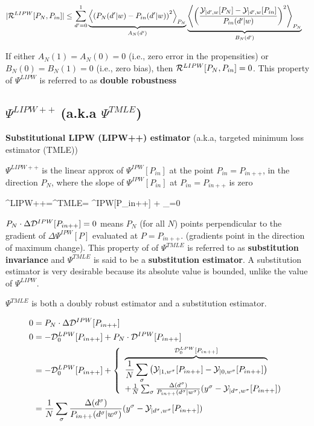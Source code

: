 \begin{align}
|{\cal R}^{LIPW}[P_N,P_{in}]|&\leq
\sum_{d'=0}^1
\underbrace{
\left\langle
\left(
P_N(d'|w)-P_{in}(d'|w)
\right)^2
\right\rangle_{P_N}
}_{A_N(d')}
\underbrace{
\left\langle
\left(
\frac{
{\cal Y}_{|d',w}[P_N]-{\cal Y}_{|d',w}[P_{in}]}
{P_{in}(d'|w)}
\right)^2
\right\rangle_{P_N}
}_{B_N(d')}
\end{align}

If either $A_N(1)=A_N(0)=0$ (i.e.,
zero error in the propensities) or $B_N(0)=B_N(1)=0$ (i.e.,
zero bias),
then ${\cal R}^{LIPW}[P_N,P_{in}]=0$.
This property
of $\Psi^{LIPW}$ is referred to as {\bf double robustness}


\subsection{$\Psi^{LIPW++}$ (a.k.a $\Psi^{TMLE}$)}

{\bf Substitutional LIPW (LIPW++) estimator}
(a.k.a, targeted minimum loss estimator (TMLE))

$\Psi^{LIPW++}$ is the
linear approx of $\Psi^{IPW}[P_{in}]$ at the point $P_{in}=P_{in++}$,
in the direction $P_N$,
where the slope
of $\Psi^{IPW}[P_{in}]$ at $P_{in}=P_{in++}$ is zero

\beq
\Psi^{LIPW++}=\Psi^{TMLE}=
\Psi^{IPW}[P_{in++}] +
_{=0}
\eeq

$P_N\cdot \Delta{\cal D}^{IPW}[P_{in++}]=0$
means $P_N$ (for all $N$)
points perpendicular to the
gradient of $\Delta\Psi^{IPW}[P]$
evaluated at $P=P_{in++}$.
(gradients point in the direction
of maximum change).
This property of
of $\Psi^{TMLE}$ is referred to as {\bf substitution
invariance} and $\Psi^{TMLE}$
is said to be a {\bf substitution estimator}.
A substitution estimator is
very desirable because
its
absolute value is bounded, unlike
the value of $\Psi^{LIPW}$.

$\Psi^{TMLE}$ is both
a doubly robust estimator and a substitution estimator.

\begin{align}
0 &=
P_N\cdot\Delta{\cal D}^{IPW}[P_{in++}]
\\
0 &=-{\cal D}^{LPW}_0[P_{in++}]+
P_N\cdot{\cal D}^{IPW}[P_{in++}]
\\
&= -{\cal D}^{LPW}_0[P_{in++}]+
\left\{
\begin{array}{l}
\overbrace{
\frac{1}{N}
\sum_\sigma
\left(
{\cal Y}_{|1,w^\sigma}[P_{in++}]
-
{\cal Y}_{|0,w^\sigma}[P_{in++}]
\right)
}^{ {\cal D}^{LPW}_0[P_{in++}]}
\\
+
\frac{1}{N}
\sum_\sigma
\frac{\Delta(d^\sigma)}{P_{in++}(d^\sigma|w^\sigma)}
(y^\sigma-{\cal Y}_{|d^\sigma,w^\sigma}[P_{in++}])
\end{array}
\right.
\\
&=
\frac{1}{N}
\sum_\sigma
\frac{\Delta(d^\sigma)}{P_{in++}(d^\sigma|w^\sigma)}
(y^\sigma-{\cal Y}_{|d^\sigma,w^\sigma}[P_{in++}])
\end{align}


